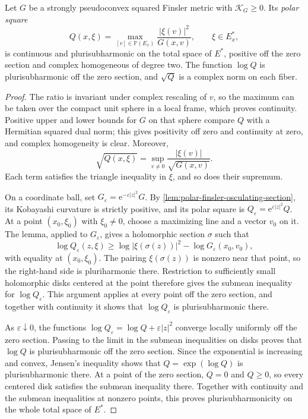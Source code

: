 \begin{proposition}\label{prop:semipositive-finsler-polar-psh}
Let $G$ be a strongly pseudoconvex squared Finsler metric with $\mathcal K_G\geq0$. Its \emph{polar square}
\[
 Q(x,\xi)=\max_{[v]\in\mathbb P(E_x)}
                \frac{|\xi(v)|^2}{G(x,v)},\qquad \xi\in E_x^*,
\]
is continuous and plurisubharmonic on the total space of $E^*$, positive off the zero section and complex homogeneous of degree two. The function $\log Q$ is plurisubharmonic off the zero section, and $\sqrt Q$ is a complex norm on each fiber.
\end{proposition}
\begin{proof}
The ratio is invariant under complex rescaling of $v$, so the maximum can be taken over the compact unit sphere in a local frame, which proves continuity. Positive upper and lower bounds for $G$ on that sphere compare $Q$ with a Hermitian squared dual norm; this gives positivity off zero and continuity at zero, and complex homogeneity is clear. Moreover,
\[
 \sqrt{Q(x,\xi)}=\sup_{v\ne0}\frac{|\xi(v)|}{\sqrt{G(x,v)}}.
\]
Each term satisfies the triangle inequality in $\xi$, and so does their supremum.

On a coordinate ball, set $G_\varepsilon=\mathrm e^{-\varepsilon|z|^2}G$. By \cref{lem:polar-finsler-osculating-section}, its Kobayashi curvature is strictly positive, and its polar square is $Q_\varepsilon=\mathrm e^{\varepsilon|z|^2}Q$. At a point $(x_0,\xi_0)$ with $\xi_0\ne0$, choose a maximizing line and a vector $v_0$ on it. The lemma, applied to $G_\varepsilon$, gives a holomorphic section $\sigma$ such that
\[
 \log Q_\varepsilon(z,\xi)
 \geq\log|\xi(\sigma(z))|^2-\log G_\varepsilon(x_0,v_0),
\]
with equality at $(x_0,\xi_0)$. The pairing $\xi(\sigma(z))$ is nonzero near that point, so the right-hand side is pluriharmonic there. Restriction to sufficiently small holomorphic disks centered at the point therefore gives the submean inequality for $\log Q_\varepsilon$. This argument applies at every point off the zero section, and together with continuity it shows that $\log Q_\varepsilon$ is plurisubharmonic there.

As $\varepsilon\downarrow0$, the functions $\log Q_\varepsilon=\log Q+\varepsilon|z|^2$ converge locally uniformly off the zero section. Passing to the limit in the submean inequalities on disks proves that $\log Q$ is plurisubharmonic off the zero section. Since the exponential is increasing and convex, Jensen's inequality shows that $Q=\exp(\log Q)$ is plurisubharmonic there. At a point of the zero section, $Q=0$ and $Q\geq0$, so every centered disk satisfies the submean inequality there. Together with continuity and the submean inequalities at nonzero points, this proves plurisubharmonicity on the whole total space of $E^*$.
\end{proof}


